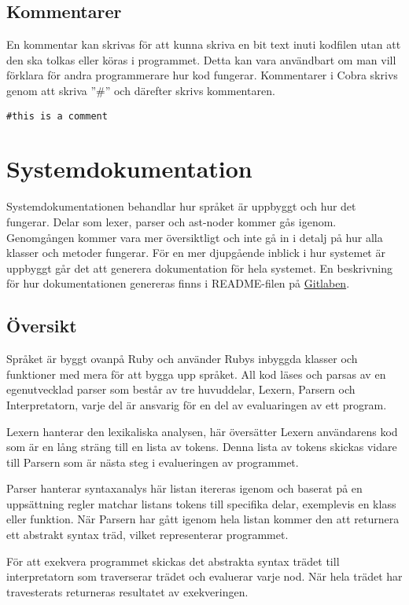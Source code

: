 \documentclass{TDP003mall}
\begin{document}
\subsection{Kommentarer}
En kommentar kan skrivas för att kunna skriva en bit text inuti kodfilen utan att den ska tolkas eller köras i programmet. 
Detta kan vara användbart om man vill förklara för andra programmerare hur kod fungerar.
Kommentarer i Cobra skrivs genom att skriva ''\#'' och därefter skrivs kommentaren.

\begin{lstlisting}[caption=Kommentar-exempel, label=lst:comment]
#this is a comment
\end{lstlisting}

\newpage
\section{Systemdokumentation}
Systemdokumentationen behandlar hur språket är uppbyggt och hur det fungerar.
Delar som lexer, parser och ast-noder kommer gås igenom. 
Genomgången kommer vara mer översiktligt och inte gå in i detalj på hur alla klasser och metoder fungerar.
För en mer djupgående inblick i hur systemet är uppbyggt går det att generera dokumentation för hela systemet.
En beskrivning för hur dokumentationen genereras finns i README-filen på \href{https://gitlab.liu.se/albda746/tdp019}{Gitlaben}.

\subsection{Översikt}
Språket är byggt ovanpå Ruby och använder Rubys inbyggda klasser och funktioner med mera för att bygga upp språket.
All kod läses och parsas av en egenutvecklad parser som består av tre huvuddelar, Lexern, Parsern och Interpretatorn, varje del är ansvarig för en del av evaluaringen av ett program.

Lexern hanterar den lexikaliska analysen, här översätter Lexern användarens kod som är en lång sträng till en lista av tokens. 
Denna lista av tokens skickas vidare till Parsern som är nästa steg i evalueringen av programmet. 

Parser hanterar syntaxanalys här listan itereras igenom och baserat på en uppsättning regler matchar listans tokens till specifika delar, exemplevis en klass eller funktion. 
När Parsern har gått igenom hela listan kommer den att returnera ett abstrakt syntax träd, vilket representerar programmet.

För att exekvera programmet skickas det abstrakta syntax trädet till interpretatorn som traverserar trädet och evaluerar varje nod.
När hela trädet har travesterats returneras resultatet av exekveringen.
\end{document}
